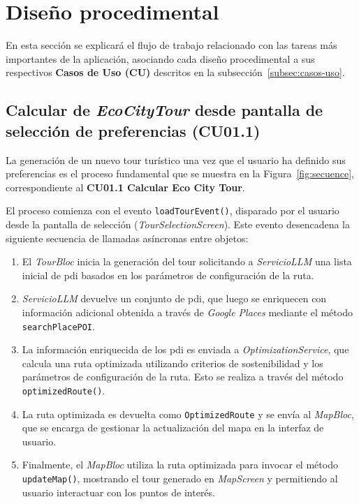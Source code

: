 \section{Diseño procedimental}
En esta sección se explicará el flujo de trabajo relacionado con las tareas más importantes de la aplicación, asociando cada diseño procedimental a sus respectivos \textbf{Casos de Uso (CU)} descritos en la subsección~\ref{subsec:casos-uso}.

\subsection{Calcular de \textit{EcoCityTour} desde pantalla de selección de preferencias (CU01.1)}
La generación de un nuevo tour turístico una vez que el usuario ha definido sus preferencias es el proceso fundamental que se muestra en la Figura~\ref{fig:secuence}, correspondiente al \textbf{CU01.1 Calcular Eco City Tour}.

El proceso comienza con el evento \texttt{loadTourEvent()}, disparado por el usuario desde la pantalla de selección (\textit{TourSelectionScreen}). Este evento desencadena la siguiente secuencia de llamadas asíncronas entre objetos:
\begin{enumerate}
	\item El \textit{TourBloc} inicia la generación del tour solicitando a \textit{ServicioLLM} una lista inicial de \acrlong{pdi} basados en los parámetros de configuración de la ruta.
	\item \textit{ServicioLLM} devuelve un conjunto de \acrlong{pdi}, que luego se enriquecen con información adicional obtenida a través de \textit{Google Places} mediante el método \texttt{searchPlacePOI}.
	\item La información enriquecida de los \acrlong{pdi} es enviada a \textit{OptimizationService}, que calcula una ruta optimizada utilizando criterios de sostenibilidad y los parámetros de configuración de la ruta. Esto se realiza a través del método \texttt{optimizedRoute()}.
	\item La ruta optimizada es devuelta como \texttt{OptimizedRoute} y se envía al \textit{MapBloc}, que se encarga de gestionar la actualización del mapa en la interfaz de usuario.
	\item Finalmente, el \textit{MapBloc} utiliza la ruta optimizada para invocar el método \texttt{updateMap()}, mostrando el tour generado en \textit{MapScreen} y permitiendo al usuario interactuar con los puntos de interés.
\end{enumerate}

